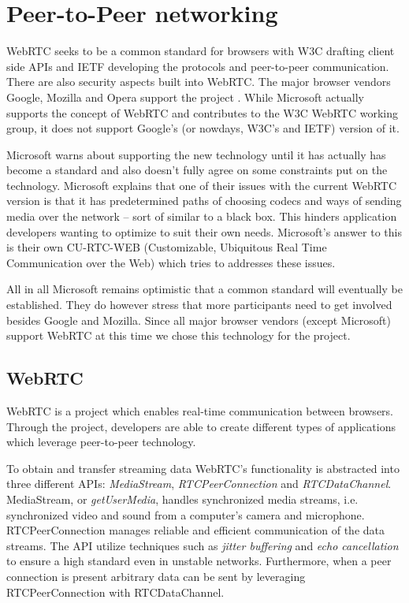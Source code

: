 \section{Peer-to-Peer networking}


WebRTC seeks to be a common standard for browsers with W3C drafting client side APIs and IETF developing the protocols and peer-to-peer communication\cite{WebRTCWorkingGroupCharter:2013:Online}. There are also security aspects built into WebRTC. The major browser vendors Google, Mozilla and Opera support the project \cite{WebRTCAndMicrosoft:2012:Online}. While Microsoft actually supports the concept of WebRTC and contributes to the W3C WebRTC working group, it does not support Google’s (or nowdays, W3C’s and IETF) version of it\cite{WebRTCAndMicrosoft:2012:Online}.

Microsoft warns about supporting the new technology until it has actually has become a standard and also doesn’t fully agree on some constraints put on the technology\cite{WebRTCAndMicrosoft:2012:Online}. Microsoft explains that one of their issues with the current WebRTC version is that it has predetermined paths of choosing codecs and ways of sending media over the network – sort of similar to a black box. This hinders application developers wanting to optimize to suit their own needs. Microsoft’s answer to this is their own CU-RTC-WEB (Customizable, Ubiquitous Real Time Communication over the Web) which tries to addresses these issues.

All in all Microsoft remains optimistic that a common standard will eventually be established\cite{WebRTCAndMicrosoft:2012:Online}. They do however stress that more participants need to get involved besides Google and Mozilla. Since all major browser vendors (except Microsoft) support WebRTC at this time we chose this technology for the project.


\subsection{WebRTC}
WebRTC is a project which enables real-time communication between browsers\cite{WebRTC:Online}. Through the project, developers are able to create different types of applications which leverage peer-to-peer technology.

To obtain and transfer streaming data WebRTC's functionality is abstracted into three different APIs: \emph{MediaStream}, \emph{RTCPeerConnection} and \emph{RTCDataChannel}\cite{WebRTCBasics:2012:Online}. MediaStream, or \emph{getUserMedia}, handles synchronized media streams, i.e. synchronized video and sound from a computer's camera and microphone. RTCPeerConnection manages reliable and efficient communication of the data streams. The API utilize techniques such as \emph{jitter buffering} and \emph{echo cancellation} to ensure a high standard even in unstable networks. Furthermore, when a peer connection is present arbitrary data can be sent by leveraging RTCPeerConnection with RTCDataChannel.


